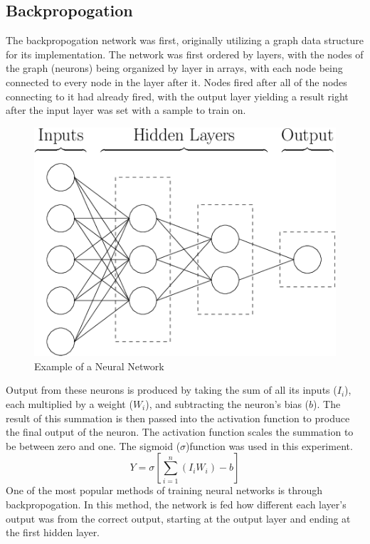 \documentclass[12pt]{article}
\begin{document}
    \subsection{Backpropogation} 
        The backpropogation network was first, originally utilizing a graph data structure for its 
        implementation.  The network was first ordered by layers, with the nodes of the graph (neurons) 
        being organized by layer in arrays, with each node being connected to every node in the layer after it.  
        Nodes fired after all of the nodes connecting to it had already fired, with the output layer yielding a result right after the 
        input layer was set with a sample to train on.
        \begin{figure}[h]
            \includegraphics[scale=.3]{nnDiagram.png}
            \centering
            \caption{Example of a Neural Network}
        \end{figure}
        Output from these neurons is produced by taking the sum of all its inputs (\(I_i\)), each multiplied by a weight (\(W_i\)), 
        and subtracting the neuron's bias (\(b\)).  The result of this summation is then passed into the activation function to produce 
        the final output of the neuron. The activation function scales the summation to be between zero and one.  The sigmoid (\(\sigma\))function
        was used in this experiment.
        \begin{equation}\label{inputSum}
            Y = \sigma[\sum_{i=1}^{n} (I_i W_i) - b] 
        \end{equation}
        One of the most popular methods of training neural networks is through backpropogation.  
        In this method, the network is fed how different each layer's output was from the correct output, 
        starting at the output layer and ending at the first hidden layer.
\end{document}
